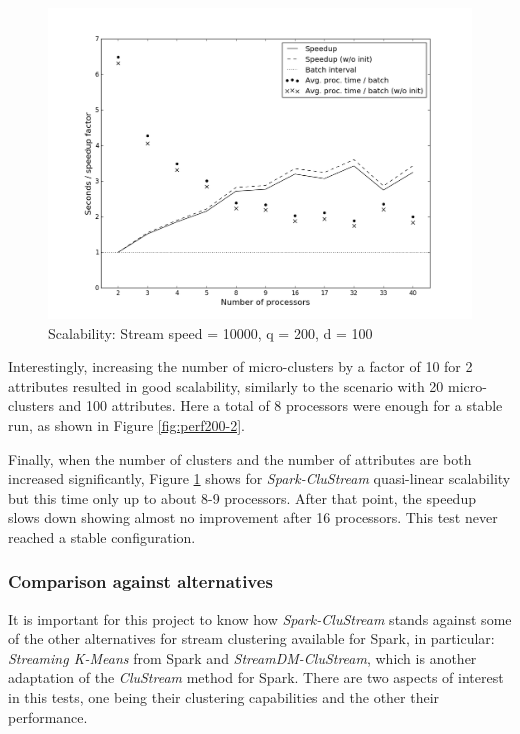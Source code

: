 \documentclass[10pt, conference, compsocconf]{IEEEtran}
\begin{document}
\begin{figure}[h!]
 \centering
 \includegraphics[scale=0.3]{./styles/perf200-100.png}
 \caption{Scalability: Stream speed = 10000, q = 200, d = 100}
 \label{fig:perf200-100}
\end{figure}

Interestingly, increasing the number of micro-clusters by a factor of 10 for 2 attributes resulted in good scalability, similarly to the scenario with 20 micro-clusters and 100 attributes. Here a total of 8 processors were enough for a stable run, as shown in Figure \ref{fig:perf200-2}.



Finally, when the number of clusters and the number of attributes are both increased significantly, Figure \ref{fig:perf200-100} shows for \textit{Spark-CluStream} quasi-linear scalability but this time only up to about 8-9 processors. After that point, the speedup slows down showing almost no improvement after 16 processors. This test never reached a stable configuration.

\subsubsection{Comparison against alternatives}

It is important for this project to know how \textit{Spark-CluStream} stands against some of the other alternatives for stream clustering available for Spark, in particular: \textit{Streaming K-Means} from Spark and \textit{StreamDM-CluStream}, which is another adaptation of the \textit{CluStream} method for Spark. There are two aspects of interest in this tests, one being their clustering capabilities and the other their performance.
\end{document}
